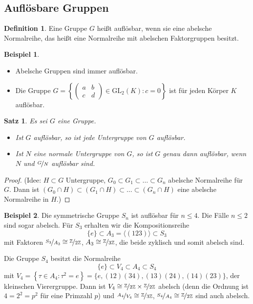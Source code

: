 \documentclass[12pt]{scrartcl} %
\newtheorem{thm}{Satz}
\theoremstyle{definition}
\newtheorem*{defn}{Definition}
\newtheorem{ex}{Beispiel}
\theoremstyle{remark}
\begin{document}
\subsection{Auflösbare Gruppen}

\begin{defn}
	Eine Gruppe $G$ heißt auflösbar, wenn sie eine abelsche Normalreihe, das heißt eine Normalreihe mit abelschen Faktorgruppen besitzt.
\end{defn}

\begin{ex}
	\begin{itemize}
		\item Abelsche Gruppen sind immer auflösbar.
		\item Die Gruppe $G=\left\{\begin{pmatrix}
			a & b \\
			c & d \end{pmatrix} \in \text{GL}_2(K):c=0\right\}$ ist für jeden Körper $K$ auflösbar.
	\end{itemize}
\end{ex}

\begin{thm}
	Es sei $G$ eine Gruppe.
	\begin{itemize}
		\item Ist $G$ auflösbar, so ist jede Untergruppe von $G$ auflösbar.
		\item Ist $N$ eine normale Untergruppe von $G$, so ist $G$ genau dann auflösbar, wenn $N$ und $\nicefrac{G}{N}$ auflösbar sind.
	\end{itemize}
\end{thm}

\begin{proof}
	(Idee: $H\subset G$ Untergruppe, $G_0\subset G_1\subset\dots\subset G_n$ abelsche Normalreihe für $G$. Dann ist $(G_0\cap H)\subset(G_1\cap H)\subset\dots\subset(G_n\cap H)$ eine abelsche Normalreihe in $H$.)
\end{proof}

\begin{ex}
	Die symmetrische Gruppe $S_n$ ist auflösbar für $n\leq 4$. Die Fälle $n\leq 2$ sind sogar abelsch. Für $S_3$ erhalten wir die Kompositionsreihe
		\[\{e\}\subset A_3=\langle(123)\rangle\subset S_3\]
	mit Faktoren $\nicefrac{S_3}{A_3}\cong\nicefrac{\mathbb{Z}}{2\mathbb{Z}}$, $A_3\cong\nicefrac{\mathbb{Z}}{3\mathbb{Z}}$, die beide zyklisch und somit abelsch sind.
	
	Die Gruppe $S_4$ besitzt die Normalreihe
		\[\{e\}\subset V_4\subset A_4\subset S_4\]
	mit $V_4=\left\{\tau\in A_4:\tau^2=e\right\}=\{e,(12)(34),(13)(24),(14)(23)\}$, der kleinschen Vierergruppe. Dann ist $V_4\cong\nicefrac{\mathbb{Z}}{2\mathbb{Z}}\times\nicefrac{\mathbb{Z}}{2\mathbb{Z}}$ abelsch (denn die Ordnung ist $4=2^2=p^2$ für eine Primzahl $p$) und $\nicefrac{A_4}{V_4}\cong\nicefrac{\mathbb{Z}}{3\mathbb{Z}}$, $\nicefrac{S_4}{A_4}\cong\nicefrac{\mathbb{Z}}{2\mathbb{Z}}$ sind auch abelsch.
\end{ex}
\end{document}
